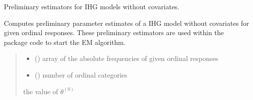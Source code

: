 \documentclass[letterpaper,10pt,english]{sphinxmanual}
\begin{document}
\begin{fulllineitems}
\label{\detokenize{cubmods:cubmods.ihg.init_theta}}
\pysigstartsignatures
{}
\pysigstopsignatures
\sphinxAtStartPar
Preliminary estimators for IHG models without covariates.

\sphinxAtStartPar
Computes preliminary parameter estimates of a IHG model without covariates for given ordinal
responses. These preliminary estimators are used within the package code to start the E\sphinxhyphen{}M algorithm.
\begin{quote}\begin{description}
\begin{itemize}
\item {} 
\sphinxAtStartPar
{} () \textendash{} array of the absolute frequencies of given ordinal responses

\item {} 
\sphinxAtStartPar
{} () \textendash{} number of ordinal categories

\end{itemize}

\sphinxAtStartPar
the value of \(\theta^{(0)}\)

\end{description}\end{quote}

\end{fulllineitems}


\begin{fulllineitems}
\label{\detokenize{cubmods:cubmods.ihg.loglik}}
\pysigstartsignatures
{}
\pysigstopsignatures
\end{fulllineitems}
\end{document}
